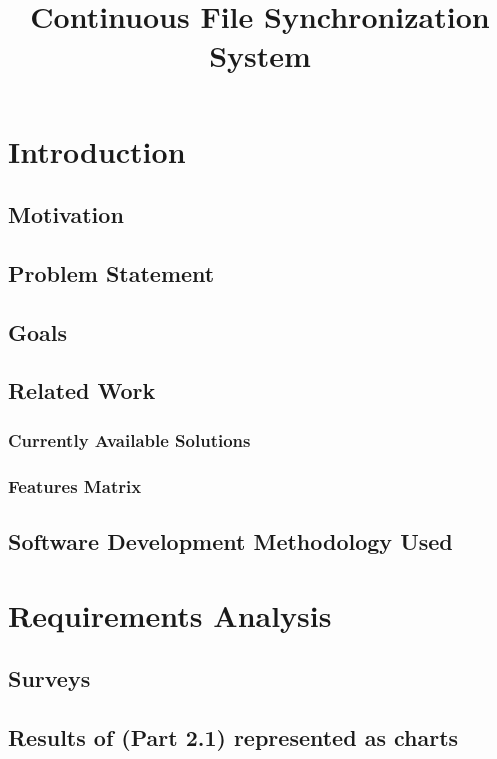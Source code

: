 \documentclass{book}
\title{
Continuous File Synchronization System 
}
\begin{document}
	
	\maketitle
	
	\chapter{Introduction}
		\section{Motivation}
		\section{Problem Statement}
		
		\section{Goals}
		
		\section{Related Work}
			\subsection{Currently Available Solutions}
			
			\subsection{Features Matrix}
			
		\section{Software Development Methodology Used}
	
	\chapter{Requirements Analysis}
		\section{Surveys}
		
		\section{Results of (Part 2.1) represented as charts}
		
\end{document}
